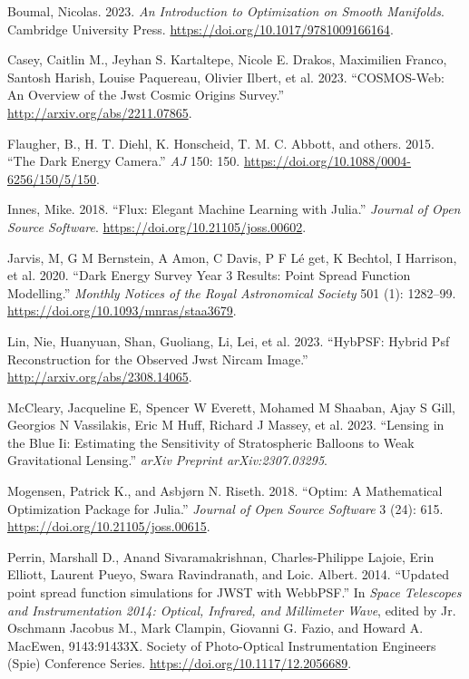 \documentclass[10pt,a4paper,onecolumn]{article}
\begin{document}
\begin{cslreferences}
\leavevmode\hypertarget{ref-boumal2023intromanifolds}{}%
Boumal, Nicolas. 2023. \emph{An Introduction to Optimization on Smooth
Manifolds}. Cambridge University Press.
\url{https://doi.org/10.1017/9781009166164}.

\leavevmode\hypertarget{ref-casey2023cosmosweb}{}%
Casey, Caitlin M., Jeyhan S. Kartaltepe, Nicole E. Drakos, Maximilien
Franco, Santosh Harish, Louise Paquereau, Olivier Ilbert, et al. 2023.
``COSMOS-Web: An Overview of the Jwst Cosmic Origins Survey.''
\url{http://arxiv.org/abs/2211.07865}.

\leavevmode\hypertarget{ref-2015AJ}{}%
Flaugher, B., H. T. Diehl, K. Honscheid, T. M. C. Abbott, and others.
2015. ``The Dark Energy Camera.'' \emph{AJ} 150: 150.
\url{https://doi.org/10.1088/0004-6256/150/5/150}.

\leavevmode\hypertarget{ref-innes:2018}{}%
Innes, Mike. 2018. ``Flux: Elegant Machine Learning with Julia.''
\emph{Journal of Open Source Software}.
\url{https://doi.org/10.21105/joss.00602}.

\leavevmode\hypertarget{ref-Jarvis_2020}{}%
Jarvis, M, G M Bernstein, A Amon, C Davis, P F Lé get, K Bechtol, I
Harrison, et al. 2020. ``Dark Energy Survey Year 3 Results: Point Spread
Function Modelling.'' \emph{Monthly Notices of the Royal Astronomical
Society} 501 (1): 1282--99.
\url{https://doi.org/10.1093/mnras/staa3679}.

\leavevmode\hypertarget{ref-lin2023hybpsf}{}%
Lin, Nie, Huanyuan, Shan, Guoliang, Li, Lei, et al. 2023. ``HybPSF:
Hybrid Psf Reconstruction for the Observed Jwst Nircam Image.''
\url{http://arxiv.org/abs/2308.14065}.

\leavevmode\hypertarget{ref-mccleary2023lensing}{}%
McCleary, Jacqueline E, Spencer W Everett, Mohamed M Shaaban, Ajay S
Gill, Georgios N Vassilakis, Eric M Huff, Richard J Massey, et al. 2023.
``Lensing in the Blue Ii: Estimating the Sensitivity of Stratospheric
Balloons to Weak Gravitational Lensing.'' \emph{arXiv Preprint
arXiv:2307.03295}.

\leavevmode\hypertarget{ref-Mogensen2018}{}%
Mogensen, Patrick K., and Asbjørn N. Riseth. 2018. ``Optim: A
Mathematical Optimization Package for Julia.'' \emph{Journal of Open
Source Software} 3 (24): 615. \url{https://doi.org/10.21105/joss.00615}.

\leavevmode\hypertarget{ref-2014SPIE}{}%
Perrin, Marshall D., Anand Sivaramakrishnan, Charles-Philippe Lajoie,
Erin Elliott, Laurent Pueyo, Swara Ravindranath, and Loic. Albert. 2014.
``Updated point spread function simulations for JWST with WebbPSF.'' In
\emph{Space Telescopes and Instrumentation 2014: Optical, Infrared, and
Millimeter Wave}, edited by Jr. Oschmann Jacobus M., Mark Clampin,
Giovanni G. Fazio, and Howard A. MacEwen, 9143:91433X. Society of
Photo-Optical Instrumentation Engineers (Spie) Conference Series.
\url{https://doi.org/10.1117/12.2056689}.


\end{cslreferences}
\end{document}
